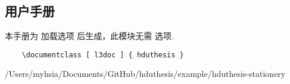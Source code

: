 \subsection{用户手册}

本手册为  加载选项  后生成，此模块无需  选项.

\begin{framed}
  \begin{verbatim}
    \documentclass [ l3doc ] { hduthesis }
  \end{verbatim}
\end{framed}


  {/Users/myhsia/Documents/GitHub/hduthesis/example/hduthesis-stationery}